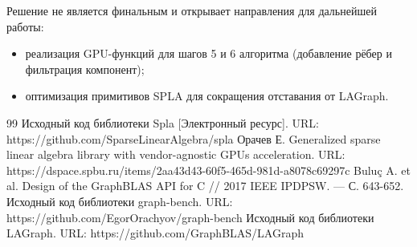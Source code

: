 \documentclass[a4paper]{article}
\begin{document}
Решение не является финальным и открывает направления для дальнейшей работы:
\begin{itemize}
    \item реализация GPU-функций для шагов 5 и 6 алгоритма (добавление рёбер и фильтрация компонент);
    \item оптимизация примитивов SPLA для сокращения отставания от LAGraph.
\end{itemize}
\begin{thebibliography}{99}
 Исходный код библиотеки Spla [Электронный ресурс]. URL: https://github.com/SparseLinearAlgebra/spla
 Орачев Е. Generalized sparse linear algebra library with vendor-agnostic GPUs acceleration. URL: https://dspace.spbu.ru/items/2aa43d43-60f5-465d-981d-a8078c69297c
 Buluç A. et al. Design of the GraphBLAS API for C // 2017 IEEE IPDPSW. — С. 643-652.
 Исходный код библиотеки graph-bench. URL: https://github.com/EgorOrachyov/graph-bench
 Исходный код библиотеки LAGraph. URL: https://github.com/GraphBLAS/LAGraph
\end{thebibliography}
\end{document}
